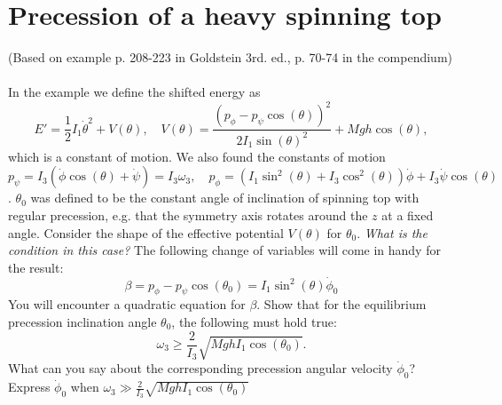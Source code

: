 \documentclass{article}
\begin{document}
    \section{Precession of a heavy spinning top}
    (Based on example p. 208-223 in Goldstein 3rd. ed., p. 70-74 in the compendium)\\ \\
    In the example we define the shifted energy as 
    \begin{equation*}
        E' = \frac{1}{2}I_1 \dot \theta^2 + V(\theta), \quad V(\theta) = \frac{(p_\phi - p_\psi \cos(\theta))^2}{2I_1\sin(\theta)^2} + Mgh\cos(\theta),
    \end{equation*}
    which is a constant of motion. We also found the constants of motion 
    \begin{equation*}
        p_\psi =  I_3(\dot \phi \cos(\theta) + \dot \psi) = I_3 \omega_3, \quad
        p_\phi = (I_1 \sin^2(\theta) + I_3 \cos^2(\theta)) \dot \phi + I_3 \dot \psi \cos(\theta)
    \end{equation*}. 
    $\theta_0$ was defined to be the constant angle of inclination of spinning top with regular precession, e.g. that the symmetry axis rotates around the $z$ at a fixed angle. Consider the shape of the effective potential $V(\theta)$ for $\theta_0$. \emph{What is the condition in this case?} The following change of variables will come in handy for the result:
    \begin{equation*}
        \beta = p_\phi - p_\psi \cos(\theta_0) = I_1 \sin^2(\theta) \dot \phi_0
    \end{equation*}
    You will encounter a quadratic equation for $\beta$. Show that for the equilibrium precession inclination angle $\theta_0$, the following must hold true:
    \begin{equation*}
        \omega_3 \ge \frac{2}{I_3}\sqrt{MghI_1 \cos(\theta_0) }.
    \end{equation*}
    What can you say about the corresponding precession angular velocity $\dot \phi_0$? Express $\dot \phi_0$ when $\omega_3 \gg \frac{2}{I_3}\sqrt{MghI_1 \cos(\theta_0) }$
\end{document}
